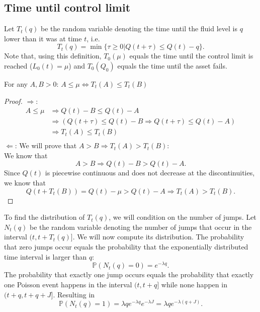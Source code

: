 \subsection{Time until control limit}
Let $T_t(q)$ be the random variable denoting the time until the fluid level is $q$ lower than it was at time $t$, i.e.
$$
T_t(q)=\min\{\tau\geq0|Q(t+\tau)\leq Q(t)-q\}.
$$
Note that, using this definition, $T_0(\mu)$ equals the time until the control limit is reached ($L_0(t)=\mu$) and $T_0(Q_0)$ equals the time until the asset fails.
\begin{lemma}\label{lemma:TimeUntilFluidLemma}
	For any $A,B>0$:
	$A\leq\mu\Leftrightarrow T_t(A)\leq T_t(B)$
	\begin{proof}
		$\Rightarrow$: 
		\[\begin{split}
		A\leq\mu&\Rightarrow Q(t)-B\leq Q(t)-A\\
		&\Rightarrow (Q(t+\tau)\leq Q(t)-B\Rightarrow Q(t+\tau)\leq Q(t)-A)\\
		&\Rightarrow T_t(A)\leq T_t(B)\\
		\end{split}\]
		$\Leftarrow$: We will prove that $A>B\Rightarrow T_t(A)> T_t(B)$:\\
		We know that
		$$
		A>B\Rightarrow Q(t)-B > Q(t)-A.
		$$
		Since $Q(t)$ is piecewise continuous and does not decrease at the discontinuities, we know that 
		$$
		Q(t+T_t(B))=Q(t)-\mu>Q(t)-A\Rightarrow T_t(A)> T_t(B).
		$$
	\end{proof}
\end{lemma}
To find the distribution of $T_t(q)$, we will condition on the number of jumps.
Let $N_t(q)$ be the random variable denoting the number of jumps that occur in the interval $(t,t+T_t(q)]$.
We will now compute its distribution.
The probability that zero jumps occur equals the probability that the exponentially distributed time interval is larger than $q$:
$$
\mathbb{P}(N_t(q)=0)=e^{-\lambda q}.
$$
The probability that exactly one jump occurs equals the probability that exactly one Poisson event happens in the interval $(t,t+q]$ while none happen in $(t+q,t+q+J]$. Resulting in
$$
\mathbb{P}(N_t(q)=1)=\lambda q e^{-\lambda q} e^{-\lambda J}=\lambda q e^{-\lambda (q+J)}.
$$

